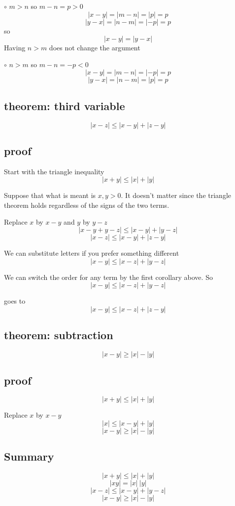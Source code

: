 \documentclass[11pt, oneside]{article}
\begin{document}
$\circ$  $m > n$ so $m - n = p > 0$
\[ |x - y| = |m - n| = |p| = p \]
\[ |y - x| = |n - m| = |-p| = p \]
so
\[ |x - y| = |y - x| \]
Having $n > m$ does not change the argument

$\circ$  $n > m$ so $m - n = -p < 0$
\[ |x - y| = |m - n| = |-p| = p \]
\[ |y - x| = |n - m| = |p| = p \]

\subsection*{theorem:  third variable}
\[ |x - z|  \le |x - y| + |z - y| \]

\subsection*{proof}
Start with the triangle inequality
\[ |x + y| \le |x| + |y| \]

Suppose that what is meant is $x,y > 0$.  It doesn't matter since the triangle theorem holds regardless of the signs of the two terms.

Replace $x$ by $x-y$ and $y$ by $y-z$ 
\[ |x-y + y-z| \le |x-y| + |y-z| \]
\[ |x - z|  \le |x - y| + |z - y| \]

We can substitute letters if you prefer something different
\[ |x - y|  \le |x - z| + |y - z| \]

We can switch the order for any term by the first corollary above.  So
\[ |x - y|  \le |x - z| + |y - z| \]

goes to
\[ |x - y|  \le |x - z| + |z - y| \]

\subsection*{theorem:  subtraction}
\[  |x - y| \ge |x| - |y|  \]

\subsection*{proof}
\[ |x + y| \le |x| + |y| \]

Replace $x$ by $x - y$
\[ |x| \le |x - y| + |y| \]
\[ |x - y| \ge |x| - |y| \]

\subsection*{Summary}
\[ |x + y| \le  |x| +  |y| \]
\[ |xy| = |x| \ |y| \]
\[ | x - z | \le | x - y | + | y - z | \]
\[ |x - y| \ge |x| - |y| \]
\end{document}
